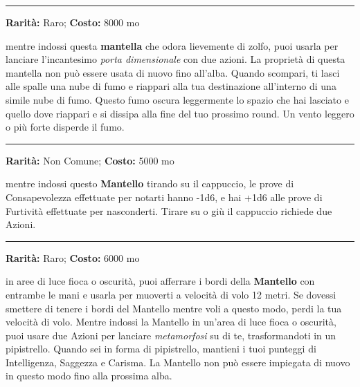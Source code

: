 \begin{multicols}{2}
\smallskip\noindent\rule{\linewidth}{2pt}  \hypertarget{MantelladelCiarlatano}{}\medskip{}\noindent\label{MantelladelCiarlatano}

\textbf{Rarità:} Raro; \textbf{Costo:} 8000 mo

mentre indossi questa \textbf{mantella} che odora lievemente di zolfo, puoi usarla per lanciare l'incantesimo \emph{porta dimensionale} con due azioni. La proprietà di questa mantella non può essere usata di nuovo fino all'alba. Quando scompari, ti lasci alle spalle una nube di fumo e riappari alla tua destinazione all'interno di una simile nube di fumo. Questo fumo oscura leggermente lo spazio che hai lasciato e quello dove riappari e si dissipa alla fine del tuo prossimo round. Un vento leggero o più forte disperde il fumo.

\smallskip\noindent\rule{\linewidth}{2pt}  \hypertarget{MantellodegliElfi}{}\medskip{}\noindent\label{MantellodegliElfi}

\textbf{Rarità:} Non Comune; \textbf{Costo:} 5000 mo

mentre indossi questo \textbf{Mantello} tirando su il cappuccio, le prove di Consapevolezza effettuate per notarti hanno -1d6, e hai +1d6 alle prove di Furtività effettuate per nasconderti. Tirare su o giù il cappuccio richiede due Azioni.

\smallskip\noindent\rule{\linewidth}{2pt}  \hypertarget{MantellodelPipistrello}{}\medskip{}\noindent\label{MantellodelPipistrello}

\textbf{Rarità:} Raro; \textbf{Costo:} 6000 mo

in aree di luce fioca o oscurità, puoi afferrare i bordi della \textbf{Mantello} con entrambe le mani e usarla per muoverti a velocità di volo 12 metri. Se dovessi smettere di tenere i bordi del Mantello mentre voli a questo modo, perdi la tua velocità di volo. Mentre indossi la Mantello in un'area di luce fioca o oscurità, puoi usare due Azioni per lanciare \emph{metamorfosi} su di te, trasformandoti in un pipistrello. Quando sei in forma di pipistrello, mantieni i tuoi punteggi di Intelligenza, Saggezza e Carisma. La Mantello non può essere impiegata di nuovo in questo modo fino alla prossima alba.


\end{multicols}
